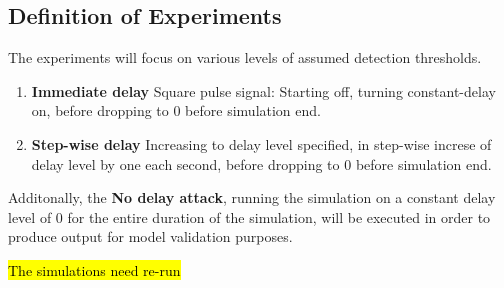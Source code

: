 \subsection{Definition of Experiments} \label{sec:ExpDef}






The experiments will focus on various levels of assumed detection thresholds.


\begin{enumerate}
    \item \textbf{Immediate delay} Square pulse signal: Starting off, turning constant-delay on,  before dropping to 0 before simulation end. 
    \item \textbf{Step-wise delay} Increasing to delay level specified, in step-wise increse of delay level by one each second, before dropping to 0 before simulation end. 
\end{enumerate}

Additonally, the  \textbf{No delay attack}, running the simulation on a constant delay level of $0$ for the entire duration of the simulation, will be executed in order to produce output for model validation purposes. 

\hl{The simulations need re-run}





